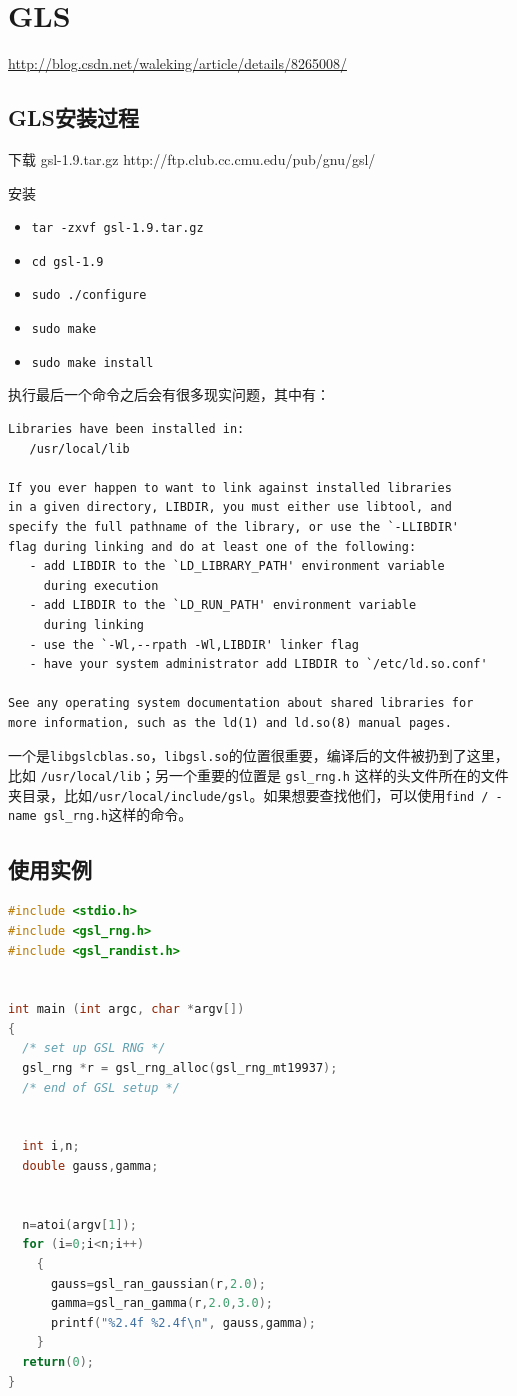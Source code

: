 \section{GLS}
\url{http://blog.csdn.net/waleking/article/details/8265008/}
\subsection{GLS安装过程}
下载 gsl-1.9.tar.gz
http://ftp.club.cc.cmu.edu/pub/gnu/gsl/

安装
\begin{itemize}
\item
\verb|tar -zxvf gsl-1.9.tar.gz|
\item
\verb|cd gsl-1.9|
\item
\verb|sudo ./configure|
\item
\verb|sudo make|
\item
\verb|sudo make install|
\end{itemize}
执行最后一个命令之后会有很多现实问题，其中有：
\begin{verbatim}
Libraries have been installed in:
   /usr/local/lib

If you ever happen to want to link against installed libraries
in a given directory, LIBDIR, you must either use libtool, and
specify the full pathname of the library, or use the `-LLIBDIR'
flag during linking and do at least one of the following:
   - add LIBDIR to the `LD_LIBRARY_PATH' environment variable
     during execution
   - add LIBDIR to the `LD_RUN_PATH' environment variable
     during linking
   - use the `-Wl,--rpath -Wl,LIBDIR' linker flag
   - have your system administrator add LIBDIR to `/etc/ld.so.conf'

See any operating system documentation about shared libraries for
more information, such as the ld(1) and ld.so(8) manual pages.
\end{verbatim}
一个是\verb|libgslcblas.so|，\verb|libgsl.so|的位置很重要，编译后的文件被扔到了这里，比如 \verb|/usr/local/lib|；另一个重要的位置是
\verb|gsl_rng.h| 这样的头文件所在的文件夹目录，比如\verb|/usr/local/include/gsl|。如果想要查找他们，可以使用\verb|find / -name gsl_rng.h|这样的命令。



\subsection{使用实例}
\begin{lstlisting}[language=C]
#include <stdio.h>
#include <gsl_rng.h>
#include <gsl_randist.h>


int main (int argc, char *argv[])
{
  /* set up GSL RNG */
  gsl_rng *r = gsl_rng_alloc(gsl_rng_mt19937);
  /* end of GSL setup */


  int i,n;
  double gauss,gamma;


  n=atoi(argv[1]);
  for (i=0;i<n;i++)
    {
      gauss=gsl_ran_gaussian(r,2.0);
      gamma=gsl_ran_gamma(r,2.0,3.0);
      printf("%2.4f %2.4f\n", gauss,gamma);
    }
  return(0);
}
\end{lstlisting}

